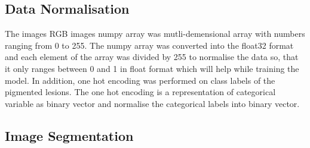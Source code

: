 \subsection{Data Normalisation}
The images RGB images numpy array was mutli-demensional array with numbers ranging from 0 to 255.
The numpy array was converted into the float32 format and each element of the array was divided by 255 to normalise the data so, that 
it only ranges between 0 and 1 in float format which will help while training the model. In addition, one hot encoding 
was performed on class labels of the pigmented lesions. The one hot encoding is a representation of categorical variable 
as binary vector and normalise the categorical labels into binary vector.

\subsection{ Image Segmentation }


